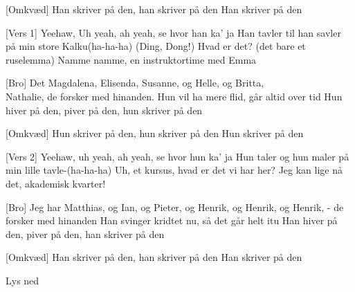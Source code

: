 \documentclass[a4paper,11pt]{article}
\begin{document}
\begin{song}
[Omkvæd] Han skriver på den, han skriver på den 
Han skriver på den

[Vers 1] Yeehaw, Uh yeah, ah yeah, se hvor han ka' ja
Han tavler til han savler på min store Kalku(ha-ha-ha)
(Ding, Dong!) Hvad er det? (det bare et ruselemma)
Namme namme, en instruktortime med Emma

[Bro] Det Magdalena, Elisenda, Susanne, og Helle, og Britta, \\
Nathalie, de forsker med hinanden.
Hun vil ha mere flid, går altid over tid
Hun hiver på den, piver på den, hun skriver på den

[Omkvæd] Hun skriver på den, hun skriver på den
Hun skriver på den

[Vers 2] Yeehaw, uh yeah, ah yeah, se hvor hun ka' ja
Hun taler og hun maler på min lille tavle-(ha-ha-ha)
Uh, et kursus, hvad er det vi har her?
Jeg kan lige nå det, akademisk kvarter!

[Bro] Jeg har Matthias, og Ian, og Pieter, og Henrik, og Henrik, 
og Henrik, - de forsker med hinanden
Han svinger kridtet nu, så det går helt itu
Han hiver på den, piver på den, han skriver på den

[Omkvæd] Han skriver på den, han skriver på den
Han skriver på den

\scene Lys ned
\end{song}
\end{document}
